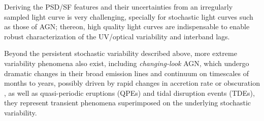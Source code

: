 Deriving the PSD/SF features and their uncertainties from an irregularly sampled light curve is very challenging, specially for stochastic light curves such as those of AGN; thereon, high quality light curves are indispensable to enable robust characterization of the UV/optical variability and interband lags.

Beyond the persistent stochastic variability described above, more extreme variability phenomena also exist, including \textit{changing-look} AGN, which undergo dramatic changes in their broad emission lines and continuum on timescales of months to years, possibly driven by rapid changes in accretion rate or obscuration \parencite{LaMassa2015ChangingLook}, as well as quasi-periodic eruptions (QPEs) and tidal disruption events (TDEs), they represent transient phenomena superimposed on the underlying stochastic variability.








